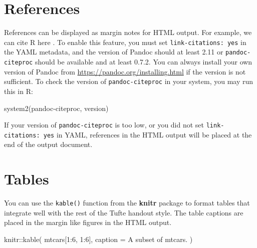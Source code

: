 \documentclass[]{tufte-handout}
\newenvironment{Shaded}{}{}
\newcommand{\AttributeTok}[1]{\textcolor[rgb]{0.49,0.56,0.16}{#1}}
\newcommand{\DecValTok}[1]{\textcolor[rgb]{0.25,0.63,0.44}{#1}}
\newcommand{\FunctionTok}[1]{\textcolor[rgb]{0.02,0.16,0.49}{#1}}
\newcommand{\NormalTok}[1]{#1}
\newcommand{\SpecialCharTok}[1]{\textcolor[rgb]{0.25,0.44,0.63}{#1}}
\newcommand{\StringTok}[1]{\textcolor[rgb]{0.25,0.44,0.63}{#1}}
\begin{document}
\hypertarget{references}{%
\section{References}\label{references}}

References can be displayed as margin notes for HTML output. For
example, we can cite R here \citep{R-base}. To enable this feature, you
must set \texttt{link-citations:\ yes} in the YAML metadata, and the
version of Pandoc should at least 2.11 or \texttt{pandoc-citeproc}
should be available and at least 0.7.2. You can always install your own
version of Pandoc from \url{https://pandoc.org/installing.html} if the
version is not sufficient. To check the version of
\texttt{pandoc-citeproc} in your system, you may run this in R:

\begin{Shaded}
\begin{Highlighting}[]
\FunctionTok{system2}\NormalTok{(}\StringTok{\textquotesingle{}pandoc{-}citeproc\textquotesingle{}}\NormalTok{, }\StringTok{\textquotesingle{}{-}{-}version\textquotesingle{}}\NormalTok{)}
\end{Highlighting}
\end{Shaded}

If your version of \texttt{pandoc-citeproc} is too low, or you did not
set \texttt{link-citations:\ yes} in YAML, references in the HTML output
will be placed at the end of the output document.

\hypertarget{tables}{%
\section{Tables}\label{tables}}

You can use the \texttt{kable()} function from the \textbf{knitr}
package to format tables that integrate well with the rest of the Tufte
handout style. The table captions are placed in the margin like figures
in the HTML output.

\begin{Shaded}
\begin{Highlighting}[]
\NormalTok{knitr}\SpecialCharTok{::}\FunctionTok{kable}\NormalTok{(}
\NormalTok{  mtcars[}\DecValTok{1}\SpecialCharTok{:}\DecValTok{6}\NormalTok{, }\DecValTok{1}\SpecialCharTok{:}\DecValTok{6}\NormalTok{], }\AttributeTok{caption =} \StringTok{\textquotesingle{}A subset of mtcars.\textquotesingle{}}
\NormalTok{)}
\end{Highlighting}
\end{Shaded}
\end{document}
